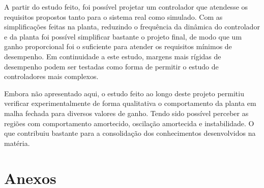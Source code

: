 \documentclass[a4paper,11pt]{article}
\begin{document}
A partir do estudo feito, foi possível projetar um controlador que atendesse os requisitos propostos tanto para o sistema real como simulado. Com as simplificações feitas na planta, reduzindo o frequência da dinâmica do controlador e da planta foi possível simplificar bastante o projeto final, de modo que um ganho proporcional foi o suficiente para atender os requisitos mínimos de desempenho. Em continuidade a este estudo, margens mais rígidas de desempenho podem ser testadas como forma de permitir o estudo de controladores mais complexos.

Embora não apresentado aqui, o estudo feito ao longo deste projeto permitiu verificar experimentalmente de forma qualitativa o comportamento da planta em malha fechada para diversos valores de ganho. Tendo sido possível perceber as regiões com comportamento amortecido, oscilação amortecida e instabilidade. O que contribuiu bastante para a consolidação dos conhecimentos desenvolvidos na matéria.

\newpage

\nocite{matlabcontrol}
\nocite{matlabsymbolic}
\nocite{ogata2010modern}

\section*{Anexos}


\end{document}
